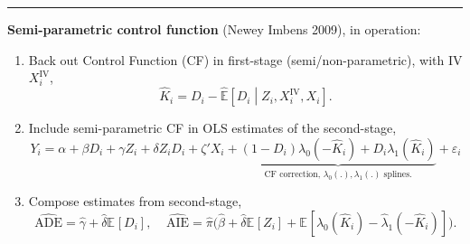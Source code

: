 \documentclass[dvipsnames]{beamer} %
\renewcommand{\vec}[1]{\boldsymbol{\mathit{#1}}}                           %
\newcommand{\E}[2][]{\mathbb{E}_{#1} \left[ #2 \right]}                    %
\renewcommand{\hat}[1]{\widehat{#1}}                                       %
\begin{document}
\begin{frame}[noframenumbering]
    \par\noindent\rule{\textwidth}{0.4pt}
    \textbf{Semi-parametric control function} (Newey Imbens 2009), in operation:
    \begin{enumerate}
        \item Back out Control Function (CF) in first-stage (semi/non-parametric), with IV $\vec X_i^\text{IV}$,
        \vspace{-0.25cm}
        \[ \hat K_i = D_i -
            \hat{\mathbb E} \left[ D_i \middle\vert Z_i, \vec X_i^\text{IV}, \vec X_i \right].
        \]
        \item Include semi-parametric CF in OLS estimates of the second-stage,
        \[ Y_i = \alpha + \beta D_i + \gamma Z_i + \delta Z_i D_i
            + \vec \zeta' \vec X_i
            + \underbrace{\left(1 - D_i \right)\lambda_0\left(-\hat K_i\right)
                + D_i \lambda_1\left(\hat K_i\right)}_{
                \text{CF correction, $\lambda_0(.), \lambda_1(.)$ splines.}}
            + \varepsilon_i \]
        \vspace{-0.5cm}
        \item Compose estimates from second-stage,
        \[ \hat{\text{ADE}}
            = \hat\gamma + \hat\delta \E{D_i}, \;\;\;\;
        \hat{\text{AIE}}
            = \hat\pi \Big(
                \hat\beta +  \hat\delta \E{Z_i}
                + \E{\hat\lambda_0\left(\hat K_i\right) -
                    \hat\lambda_1\left(-\hat K_i\right)}\Big). \]
    \end{enumerate}
\end{frame}
\end{document}
